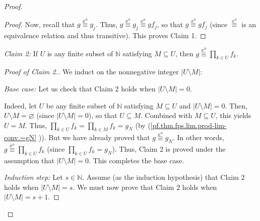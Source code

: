 \begin{fineprint}
\begin{proof}
\begin{proof}
Now, recall that $g\overset{x^{n}}{\equiv}g_{j}$. Thus, $g\overset{x^{n}%
}{\equiv}g_{j}\overset{x^{n}}{\equiv}gf_{j}$, so that $g\overset{x^{n}%
}{\equiv}gf_{j}$ (since $\overset{x^{n}}{\equiv}$ is an equivalence relation
and thus transitive). This proves Claim 1.
\end{proof}

\begin{statement}
\textit{Claim 2:} If $U$ is any finite subset of $\mathbb{N}$ satisfying
$M\subseteq U$, then $g\overset{x^{n}}{\equiv}\prod_{k\in U}f_{k}$.
\end{statement}

\begin{proof}
[Proof of Claim 2.]We induct on the nonnegative integer $\left\vert U\setminus
M\right\vert $:

\textit{Base case:} Let us check that Claim 2 holds when $\left\vert
U\setminus M\right\vert =0$.

Indeed, let $U$ be any finite subset of $\mathbb{N}$ satisfying $M\subseteq U$
and $\left\vert U\setminus M\right\vert =0$. Then, $U\setminus M=\varnothing$
(since $\left\vert U\setminus M\right\vert =0$), so that $U\subseteq M$.
Combined with $M\subseteq U$, this yields $U=M$. Thus, $\prod_{k\in U}%
f_{k}=\prod_{k\in M}f_{k}=g_{N}$ (by (\ref{pf.thm.fps.lim.prod-lim-conv.=gN}%
)). But we have already proved that $g\overset{x^{n}}{\equiv}g_{N}$. In other
words, $g\overset{x^{n}}{\equiv}\prod_{k\in U}f_{k}$ (since $\prod_{k\in
U}f_{k}=g_{N}$). Thus, Claim 2 is proved under the assumption that $\left\vert
U\setminus M\right\vert =0$. This completes the base case.

\textit{Induction step:} Let $s\in\mathbb{N}$. Assume (as the induction
hypothesis) that Claim 2 holds when $\left\vert U\setminus M\right\vert =s$.
We must now prove that Claim 2 holds when $\left\vert U\setminus M\right\vert
=s+1$.


\end{proof}
\end{proof}
\end{fineprint}
